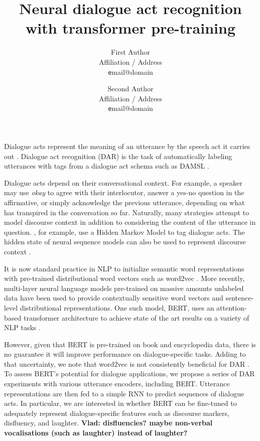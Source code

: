 \documentclass[11pt,a4paper,headings=standardclasses]{article}
\title{Neural dialogue act recognition with transformer pre-training} %
\author{
  First Author \\
  Affiliation / Address \\
  {\texttt email@domain} \\\and
  Second Author \\
  Affiliation / Address \\
  {\texttt email@domain} \\
}
\date{}
\begin{document}
\maketitle

Dialogue acts represent the meaning of an utterance by the speech act it carries out \citep{austinHowThingsWords2009}.
Dialogue act recognition (DAR) is the task of automatically labeling utterances with tags from a dialogue act schema such as DAMSL \citep{coreCodingDialogsDAMSL1997}.

Dialogue acts depend on their conversational context.
For example, a speaker may use \textit{okay} to agree with their interlocutor, answer a yes-no question in the affirmative, 
or simply acknowledge the previous utterance, depending on what has transpired in the conversation so far.
Naturally, many strategies attempt to model discourse context in addition to considering the content of the utterance in question.
\cite{stolckeDialogueActModeling2000}, for example, use a Hidden Markov Model to tag dialogue acts.
The hidden state of neural sequence models can also be used to represent discourse context 
\citep[e.g.][]{kalchbrennerRecurrentConvolutionalNeural2013,tranPreservingDistributionalInformation2017}.


It is now standard practice in NLP to initialize semantic word representations
with pre-trained distributional word vectors such as word2vec \citep{mikolov2013distributed}.
More recently, multi-layer neural language models pre-trained on massive amounts unlabeled data
have been used to provide contextually sensitive word vectors and sentence-level distributional representations.
One such model, BERT, uses an attention-based transformer architecture to achieve state of the art results
on a variety of NLP tasks \citep{devlinBERTPretrainingDeep2018}.

However, given that BERT is pre-trained on book and encyclopedia data, 
there is no guarantee it will improve performance on dialogue-specific tasks.
Adding to that uncertainty, we note that word2vec is not consistently beneficial for DAR \citep{cerisaraEffectsUsingWord2vec2017}.
To assess BERT's potential for dialogue applications, we propose a series of DAR experiments 
with various utterance encoders, including BERT.
Utterance representations are then fed to a simple RNN to predict sequences of dialogue acts.
In particular, we are interested in whether BERT can be fine-tuned to adequately represent
dialogue-specific features such as discourse markers, disfluency, and laughter. \textbf{Vlad: disfluencies? maybe non-verbal vocalisations (such as laughter) instead of laughter?}
\end{document}
